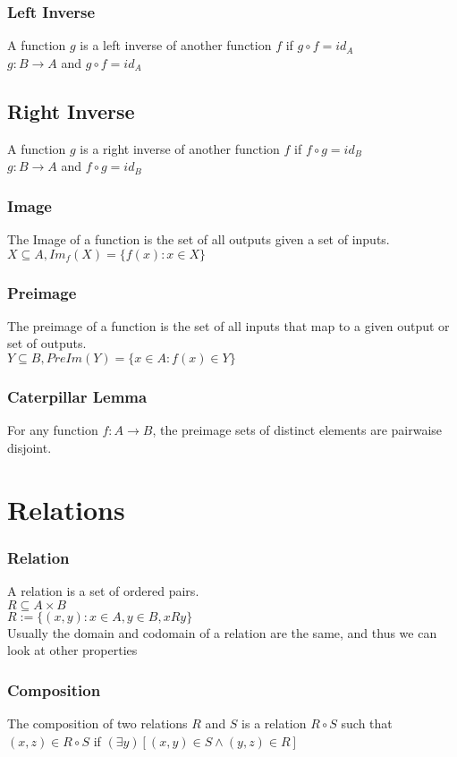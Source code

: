 \documentclass{article}
\begin{document}
\subsubsection*{Left Inverse}
A function $g$ is a left inverse of another function $f$ if $g \circ f = id_A$\\
$g : B \rightarrow A$ and $g \circ f = id_A$\\
\subsection*{Right Inverse}
A function $g$ is a right inverse of another function $f$ if $f \circ g = id_B$\\
$g : B \rightarrow A$ and $f \circ g = id_B$\\
\subsubsection*{Image}
The Image of a function is the set of all outputs given a set of inputs.\\
$X \subseteq A, Im_f(X) = \{f(x) : x \in X \}$
\subsubsection*{Preimage}
The preimage of a function is the set of all inputs that map to a given output or set of outputs.\\
$Y \subseteq B, PreIm(Y) = \{x \in A : f(x) \in Y\}$
\subsubsection*{Caterpillar Lemma}
For any function $f : A \rightarrow B$, the preimage sets of distinct elements are pairwaise disjoint.

\section{Relations}
\subsubsection*{Relation}
A relation is a set of ordered pairs.\\
$R \subseteq A \times B$\\
$R := \{(x,y): x\in A, y \in B, xRy\}$\\
Usually the domain and codomain of a relation are the same, and thus we can look at other properties 
\subsubsection*{Composition}
The composition of two relations $R$ and $S$ is a relation $R \circ S$ such that $(x,z) \in R \circ S$ if $(\exists y)[(x,y) \in S \wedge (y,z) \in R]$\\
\end{document}
